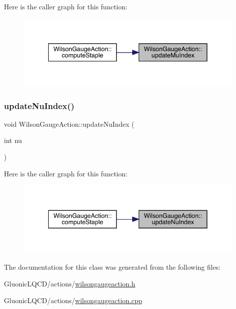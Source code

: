 Here is the caller graph for this function\+:\nopagebreak
\begin{figure}[H]
\begin{center}
\leavevmode
\includegraphics[width=335pt]{class_wilson_gauge_action_ab7ed4ab8e475f5a188cd19ce720a5eb9_icgraph}
\end{center}
\end{figure}
\mbox{\label{class_wilson_gauge_action_a010b3b8870476dfec4c48a01b6d6fc1d}} 
\subsubsection{\texorpdfstring{updateNuIndex()}{updateNuIndex()}}
{\footnotesize\ttfamily void Wilson\+Gauge\+Action\+::update\+Nu\+Index (\begin{DoxyParamCaption}\item[{int}]{nu }\end{DoxyParamCaption})\hspace{0.3cm}{\ttfamily [inline]}}

Here is the caller graph for this function\+:\nopagebreak
\begin{figure}[H]
\begin{center}
\leavevmode
\includegraphics[width=335pt]{class_wilson_gauge_action_a010b3b8870476dfec4c48a01b6d6fc1d_icgraph}
\end{center}
\end{figure}


The documentation for this class was generated from the following files\+:\begin{DoxyCompactItemize}
\item 
Gluonic\+L\+Q\+C\+D/actions/\mbox{\hyperlink{wilsongaugeaction_8h}{wilsongaugeaction.\+h}}\item 
Gluonic\+L\+Q\+C\+D/actions/\mbox{\hyperlink{wilsongaugeaction_8cpp}{wilsongaugeaction.\+cpp}}\end{DoxyCompactItemize}
